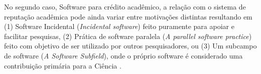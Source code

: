 No segundo caso, Software para crédito acadêmico, a relação com o sistema de
reputação acadêmica pode ainda variar entre motivações distintas resultando em
(1) Software Incidental ({\it Incidental software})
feito puramente para apoiar e facilitar pesquisas,
(2) Prática de software paralela ({\it A parallel software practice})
feito com objetivo de ser utilizado por outros pesquisadores, ou
(3) Um subcampo de software ({\it A Software Subfield}),
onde o próprio software é considerado uma contribuição primária para a Ciência
\cite{howison2011scientific}.






%
%

%

